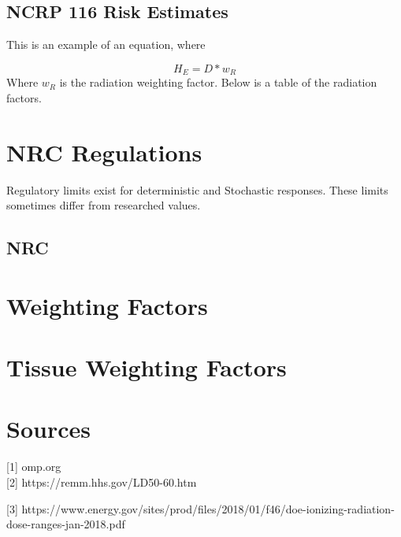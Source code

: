 \documentclass{article}
\begin{document}
\begin{multicols}{3}
\begin{center}
\subsection*{NCRP 116 Risk Estimates}


\end{center}



This is an example of an equation, where

$$H_E = D * w_R$$ Where $w_R$ is the radiation weighting factor. Below is a table of the radiation factors. 

\section*{NRC Regulations}

Regulatory limits exist for deterministic and Stochastic responses. These limits sometimes differ from researched values.

\subsection*{NRC}


\section*{Weighting Factors}



\section*{Tissue Weighting Factors}



\section*{Sources}

[1] omp.org
\\

[2] https://remm.hhs.gov/LD50-60.htm

[3] https://www.energy.gov/sites/prod/files/2018/01/f46/doe-ionizing-radiation-dose-ranges-jan-2018.pdf

\end{multicols}
\end{document}
